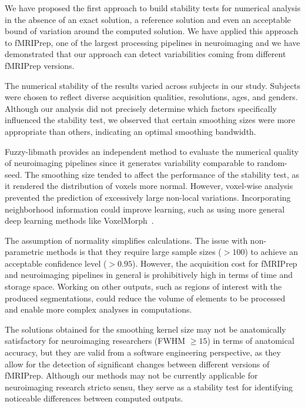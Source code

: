 \documentclass[lettersize,journal]{IEEEtran}
\newcommand{\fmriprep}{fMRIPrep\xspace}
\begin{document}

We have proposed the first approach to build stability tests for numerical analysis in the absence of an exact solution, a reference solution and even an acceptable bound of variation around the computed solution. We have applied this approach to \fmriprep, one of the largest processing pipelines in neuroimaging and we have demonstrated that our approach can detect variabilities coming from different \fmriprep versions.

The numerical stability of the results varied across subjects in our study. Subjects were chosen to reflect diverse acquisition qualities, resolutions, ages, and genders. Although our analysis did not precisely determine which factors specifically influenced the stability test, we observed that certain smoothing sizes were more appropriate than others, indicating an optimal smoothing bandwidth.

Fuzzy-libmath provides an independent method to evaluate the numerical quality of neuroimaging pipelines since it generates variability comparable to random-seed. The smoothing size tended to affect the performance of the stability test, as it rendered the distribution of voxels more normal. However, voxel-wise analysis prevented the prediction of excessively large non-local variations. Incorporating neighborhood information could improve learning, such as using more general deep learning methods like VoxelMorph~\cite{balakrishnan2019voxelmorph}.

The assumption of normality simplifies calculations. The issue with non-parametric methods is that they require large sample sizes ($>100$) to achieve an acceptable confidence level ($>0.95$). However, the acquisition cost for \fmriprep and neuroimaging pipelines in general is prohibitively high in terms of time and storage space. Working on other outputs, such as regions of interest with the produced segmentations, could reduce the volume of elements to be processed and enable more complex analyses in computations.

The solutions obtained for the smoothing kernel size may not be anatomically satisfactory for neuroimaging researchers (FWHM $\geq 15$) in terms of anatomical accuracy, but they are valid from a software engineering perspective, as they allow for the detection of significant changes between different versions of \fmriprep. Although our methods may not be currently applicable for neuroimaging research stricto sensu, they serve as a stability test for identifying noticeable differences between computed outputs.
\end{document}
